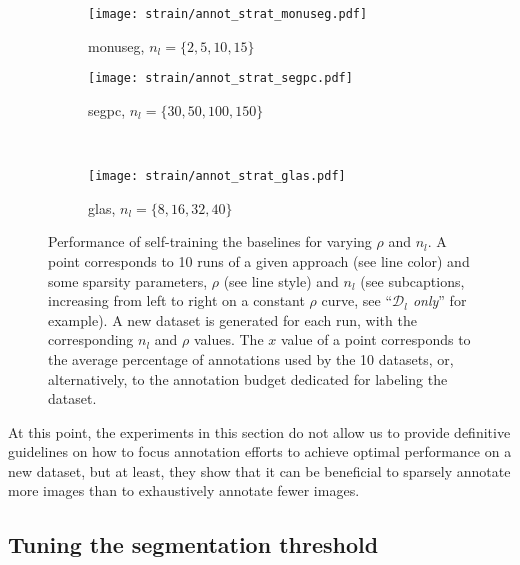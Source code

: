 \begin{figure}[t]
  \centering
  \begin{subfigure}{0.48\textwidth}
    \centering
    \texttt{[image: strain/annot\_strat\_monuseg.pdf]}
    \caption{\acrshort{monuseg}, $n_l = \{2, 5, 10, 15\}$ }
    \label{fig:strain:annot_strat_monuseg}
  \end{subfigure}
  \begin{subfigure}{0.48\textwidth}
    \centering
    \texttt{[image: strain/annot\_strat\_segpc.pdf]}
    \caption{\acrshort{segpc}, $n_l = \{30, 50, 100, 150\}$ }
    \label{fig:strain:annot_strat_segpc}
  \end{subfigure} \\
  \begin{subfigure}{0.48\textwidth}
    \centering
    \texttt{[image: strain/annot\_strat\_glas.pdf]}
    \caption{\acrshort{glas}, $n_l = \{8, 16, 32, 40\}$ }
    \label{fig:strain:annot_strat_glas}
  \end{subfigure}
  \caption{Performance of self-training \vs the baselines for varying $\rho$ and $n_l$. A point corresponds to 10 runs of a given approach (see line color) and some sparsity parameters, $\rho$ (see line style) and $n_l$ (see subcaptions, increasing from left to right on a constant $\rho$ curve, see ``\textit{$\mathcal{D}_l$ only}'' for example). A new dataset is generated for each run, with the corresponding $n_l$ and $\rho$ values. The $x$ value of a point corresponds to the average percentage of annotations used by the 10 datasets, or, alternatively, to the annotation budget dedicated for labeling the dataset.}
  \label{fig:straing:annot_strat}
\end{figure}

At this point, the experiments in this section do not allow us to provide definitive guidelines on how to focus annotation efforts to achieve optimal performance on a new dataset, but at least, they show  that it can be beneficial to sparsely annotate more images than to exhaustively annotate fewer images.

\subsection{Tuning the segmentation threshold}\label{sec:straing:manualtuning}

